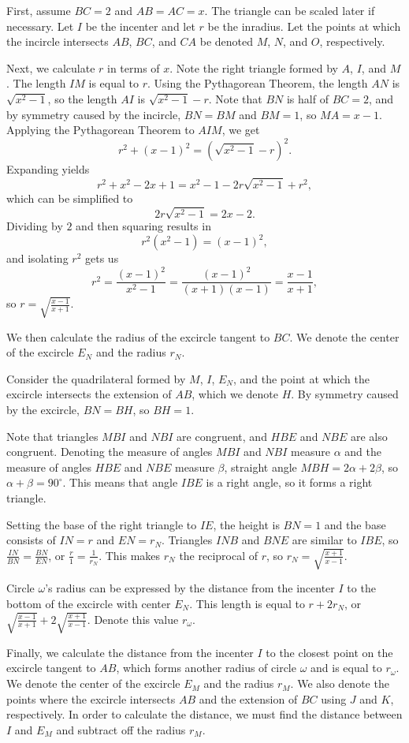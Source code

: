 \begin{enumerate}
 First, assume $BC=2$ and $AB=AC=x$. The triangle can be scaled later if necessary. Let $I$ be the incenter and let $r$ be the inradius. Let the points at which the incircle intersects $AB$, $BC$, and $CA$ be denoted $M$, $N$, and $O$, respectively.

 
Next, we calculate $r$ in terms of $x$. Note the right triangle formed by $A$, $I$, and $M$. The length $IM$ is equal to $r$. Using the Pythagorean Theorem, the length $AN$ is $\sqrt{x^2-1}$, so the length $AI$ is $\sqrt{x^2-1}-r$. Note that $BN$ is half of $BC=2$, and by symmetry caused by the incircle, $BN=BM$ and $BM=1$, so $MA=x-1$. Applying the Pythagorean Theorem to $AIM$, we get
 \[r^2+(x-1)^2=\left(\sqrt{x^2-1}-r\right)^2.\]Expanding yields
 \[r^2+x^2-2x+1=x^2-1-2r\sqrt{x^2-1}+r^2,\]which can be simplified to
 \[2r\sqrt{x^2-1}=2x-2.\]Dividing by $2$ and then squaring results in
 \[r^2(x^2-1)=(x-1)^2,\]and isolating $r^2$ gets us
 \[r^2=\frac{(x-1)^2}{x^2-1}=\frac{(x-1)^2}{(x+1)(x-1)}=\frac{x-1}{x+1},\]so $r=\sqrt{\frac{x-1}{x+1}}$.

 
We then calculate the radius of the excircle tangent to $BC$. We denote the center of the excircle $E_N$ and the radius $r_N$.

 Consider the quadrilateral formed by $M$, $I$, $E_N$, and the point at which the excircle intersects the extension of $AB$, which we denote $H$. By symmetry caused by the excircle, $BN=BH$, so $BH=1$.

 Note that triangles $MBI$ and $NBI$ are congruent, and $HBE$ and $NBE$ are also congruent. Denoting the measure of angles $MBI$ and $NBI$ measure $\alpha$ and the measure of angles $HBE$ and $NBE$ measure $\beta$, straight angle $MBH=2\alpha+2\beta$, so $\alpha + \beta=90^\circ$. This means that angle $IBE$ is a right angle, so it forms a right triangle.

 Setting the base of the right triangle to $IE$, the height is $BN=1$ and the base consists of $IN=r$ and $EN=r_N$. Triangles $INB$ and $BNE$ are similar to $IBE$, so $\frac{IN}{BN}=\frac{BN}{EN}$, or $\frac{r}{1}=\frac{1}{r_N}$. This makes $r_N$ the reciprocal of $r$, so $r_N=\sqrt{\frac{x+1}{x-1}}$.

 
Circle $\omega$'s radius can be expressed by the distance from the incenter $I$ to the bottom of the excircle with center $E_N$. This length is equal to $r+2r_N$, or $\sqrt{\frac{x-1}{x+1}}+2\sqrt{\frac{x+1}{x-1}}$. Denote this value $r_\omega$.

 
Finally, we calculate the distance from the incenter $I$ to the closest point on the excircle tangent to $AB$, which forms another radius of circle $\omega$ and is equal to $r_\omega$. We denote the center of the excircle $E_M$ and the radius $r_M$. We also denote the points where the excircle intersects $AB$ and the extension of $BC$ using $J$ and $K$, respectively. In order to calculate the distance, we must find the distance between $I$ and $E_M$ and subtract off the radius $r_M$.


\end{enumerate}
